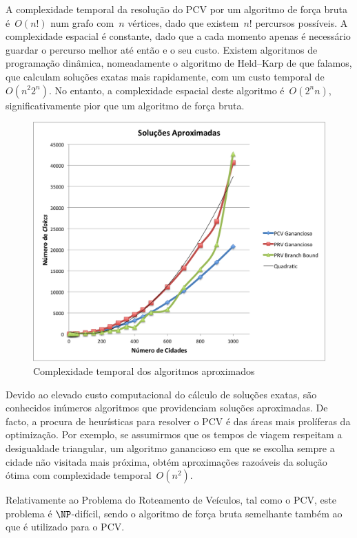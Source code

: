 \documentclass[12pt,a4paper,reqno]{report}
\numberwithin{equation}{section}
\begin{document}
A complexidade temporal da resolução do PCV por um algoritmo de força bruta é~$O(n!)$ num grafo com~$n$ vértices, dado que existem~$n!$ percursos possíveis. A complexidade espacial é constante, dado que a cada momento apenas é necessário guardar o percurso melhor até então e o seu custo. Existem algoritmos de programação dinâmica, nomeadamente o algoritmo de Held–Karp de que falamos, que calculam soluções exatas mais rapidamente, com um custo temporal de~$O(n^2 2^n)$. No entanto, a complexidade espacial deste algoritmo é~$O(2^n n)$, significativamente pior que um algoritmo de força bruta.

\begin{figure} [ht]
\begin{center}
\includegraphics[width=15cm]{aprox.png}
\caption{Complexidade temporal dos algoritmos aproximados}
\label{aprox}
\end{center}
\end{figure}

Devido ao elevado custo computacional do cálculo de soluções exatas, são conhecidos inúmeros algoritmos que providenciam soluções aproximadas. De facto, a procura de heurísticas para resolver o PCV é das áreas mais prolíferas da optimização. Por exemplo, se assumirmos que os tempos de viagem respeitam a desigualdade triangular, um algoritmo ganancioso em que se escolha sempre a cidade não visitada mais próxima, obtém aproximações razoáveis da solução ótima com complexidade temporal~$O(n^2)$.

Relativamente ao Problema do Roteamento de Veículos, tal como o PCV, este problema é $\NP$-difícil, sendo o algoritmo de força bruta semelhante também ao que é utilizado para o PCV.
\end{document}
